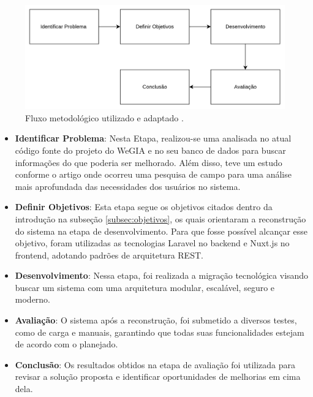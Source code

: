     \begin{figure}[H]
        \centering
        \includegraphics[width=1\linewidth]{imagens/Metodologia_utilizada.png}
        \caption{Fluxo metodológico utilizado e adaptado \citep{pimentel2020dsr} .}
        \label{fig:metodologia_utilizada}
    \end{figure}

     \begin{itemize}
        \item \textbf{Identificar Problema}:   
            Nesta Etapa, realizou-se uma analisada no atual código fonte do projeto do WeGIA e no seu banco de dados para buscar informações do que poderia ser melhorado. Além disso, teve um estudo conforme o artigo \cite[]{latinoware2024wegia} onde ocorreu uma pesquisa de campo para uma análise mais aprofundada das necessidades dos usuários no sistema.
        \item \textbf{Definir Objetivos}: 
            Esta etapa segue os objetivos citados dentro da introdução na subseção \ref{subsec:objetivos}, os quais orientaram a reconstrução do sistema na etapa de desenvolvimento. Para que fosse possível alcançar esse objetivo, foram utilizadas as tecnologias Laravel no backend e Nuxt.js no frontend, adotando padrões de arquitetura REST.
        \item \textbf{Desenvolvimento}: 
            Nessa etapa, foi realizada a migração tecnológica visando buscar um sistema com uma arquitetura modular, escalável, seguro e moderno.
        \item \textbf{Avaliação}: 
            O sistema após a reconstrução, foi submetido a diversos testes, como de carga e manuais, garantindo que todas suas funcionalidades estejam de acordo com o planejado.
        \item \textbf{Conclusão}:
            Os resultados obtidos na etapa de avaliação foi utilizada para revisar a solução proposta e identificar oportunidades de melhorias em cima dela.
    \end{itemize}

